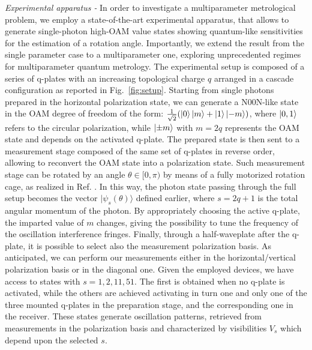 \documentclass[aps,pra,twocolumn,notitlepage,superscriptaddress]{revtex4-1}
\begin{document}
\emph{Experimental apparatus -}
%
In order to investigate a multiparameter metrological problem, we employ a state-of-the-art experimental apparatus, that allows to generate single-photon high-OAM value states showing quantum-like sensitivities for the estimation of a rotation angle. Importantly, we extend the result from the single parameter case \cite{cimini2021non} to a multiparameter one, exploring unprecedented regimes for multiparameter quantum metrology. The experimental setup is composed of a series of q-plates \cite{marrucci-2006spin-to-orbital,cimini2021non} with an increasing topological charge $q$ arranged in a cascade configuration as reported in Fig.~\ref{fig:setup}. Starting from single photons prepared in the horizontal polarization state, we can generate a N00N-like state in the OAM degree of freedom of the form: $\frac{1}{\sqrt{2}}(\ket{0}\ket{m}+\ket{1}\ket{-m})$, where $\ket{0,1}$ refers to the circular polarization, while $\ket{\pm m}$ with $m=2q$ represents the OAM state and depends on the activated q-plate. The prepared state is then sent to a measurement stage composed of the same set of q-plates in reverse order, allowing to reconvert the OAM state into a polarization state. Such measurement stage can be rotated by an angle $\theta\in[0, \pi)$ by means of a fully motorized rotation cage, as realized in Ref. \cite{cimini2021non}. In this way, the photon state passing through the full setup becomes the vector $|\psi_s(\theta)\rangle$ defined earlier, where $s=2q+1$ is the total angular momentum of the photon. By appropriately choosing the active q-plate, the imparted value of $m$ changes, giving the possibility to tune the frequency of the oscillation interference fringes. Finally, through a half-waveplate after the q-plate, it is possible to select also the measurement polarization basis. As anticipated, we can perform our measurements either in the horizontal/vertical polarization basis or in the diagonal one. Given the employed devices, we have access to states with $s = 1,2,11,51$. The first is obtained when no q-plate is activated, while the others are achieved activating in turn one and only one of the three mounted q-plates in the preparation stage, and the corresponding one in the receiver. These states generate oscillation patterns, retrieved from measurements in the polarization basis and characterized by visibilities $V_s$ which depend upon the selected $s$.
%
\end{document}
